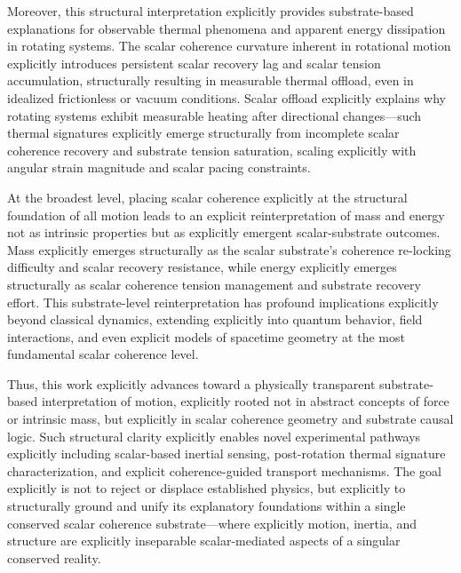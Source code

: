 \documentclass[preprints,article,submit,pdftex,moreauthors]{Definitions/mdpi}
\begin{document}
Moreover, this structural interpretation explicitly provides substrate-based explanations for observable thermal phenomena and apparent energy dissipation in rotating systems. The scalar coherence curvature inherent in rotational motion explicitly introduces persistent scalar recovery lag and scalar tension accumulation, structurally resulting in measurable thermal offload, even in idealized frictionless or vacuum conditions. Scalar offload explicitly explains why rotating systems exhibit measurable heating after directional changes—such thermal signatures explicitly emerge structurally from incomplete scalar coherence recovery and substrate tension saturation, scaling explicitly with angular strain magnitude and scalar pacing constraints.

At the broadest level, placing scalar coherence explicitly at the structural foundation of all motion leads to an explicit reinterpretation of mass and energy not as intrinsic properties but as explicitly emergent scalar-substrate outcomes. Mass explicitly emerges structurally as the scalar substrate's coherence re-locking difficulty and scalar recovery resistance, while energy explicitly emerges structurally as scalar coherence tension management and substrate recovery effort. This substrate-level reinterpretation has profound implications explicitly beyond classical dynamics, extending explicitly into quantum behavior, field interactions, and even explicit models of spacetime geometry at the most fundamental scalar coherence level.

Thus, this work explicitly advances toward a physically transparent substrate-based interpretation of motion, explicitly rooted not in abstract concepts of force or intrinsic mass, but explicitly in scalar coherence geometry and substrate causal logic. Such structural clarity explicitly enables novel experimental pathways explicitly including scalar-based inertial sensing, post-rotation thermal signature characterization, and explicit coherence-guided transport mechanisms. The goal explicitly is not to reject or displace established physics, but explicitly to structurally ground and unify its explanatory foundations within a single conserved scalar coherence substrate—where explicitly motion, inertia, and structure are explicitly inseparable scalar-mediated aspects of a singular conserved reality.



\end{document}
